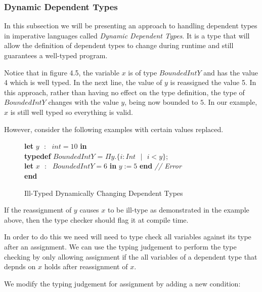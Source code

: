 \documentclass[a4paper,12pt]{report}
\newenvironment{tabs}[1]
 {\flushleft\TabPositions{#1}}
 {\endflushleft}
\begin{document}
\subsubsection{Dynamic Dependent Types}
In this subsection we will be presenting an approach to handling dependent types 
in imperative languages called \textit{Dynamic Dependent Types}. It is a type 
that will allow the definition of dependent types to change during runtime and 
still guarantees a well-typed program. 

\par
Notice that in figure 4.5, the variable $x$ is 
of type $BoundedIntY$ and has the value 4 which is well typed. In the next line, 
the value of $y$ is reassigned the value 5. In this approach, rather than having 
no effect on the type definition, the type of $BoundedIntY$ changes with the 
value $y$, being now bounded to $5$. In our example, $x$ is still well typed so 
everything is valid. 


\par
However, consider the following examples with certain values replaced. 

\begin{figure} [H]
  \begin{tabs}{1cm,2cm}
    \textbf{let }$y\text{ }:\text{ } int = 10$ \textbf{ in } \\
    \tab\textbf{typedef }$BoundedIntY$ = $\Pi y. \{i : Int\text{ }|\text{ }i < y\}$; \\ 
    \tab\textbf{let }$x\text{ }:\text{ }BoundedIntY = 6$ \textbf{ in }$y := 5$\textbf { end }\textit{// Error}
 \\
    \textbf {end}
  \end{tabs}  
  \caption{Ill-Typed Dynamically Changing Dependent Types}
\end{figure}

\par
If the reassignment of $y$ causes $x$ to be ill-type as demonstrated in the 
example above, then the type checker should flag it at compile time. 

\par
In order to do this we need will need to type check all variables against its 
type after an assignment. We can use the typing judgement to perform the 
type checking by only allowing assignment if the all variables of a dependent 
type that depnds on $x$ holds after reassignment of $x$.

\par
We modify the typing judgement for assignment by adding a new condition:
\end{document}
